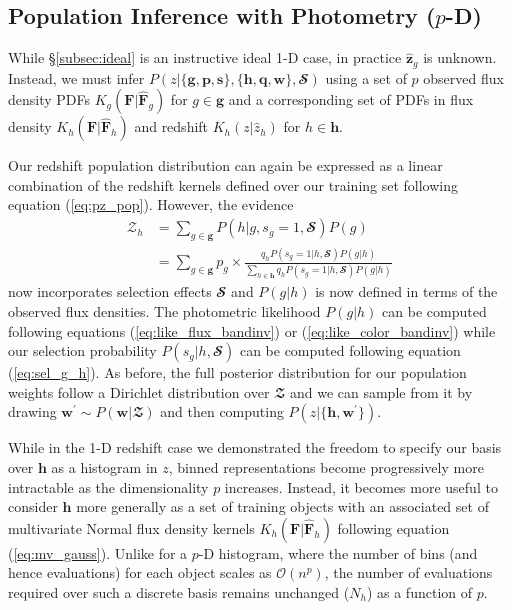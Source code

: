 \documentclass[a4paper,fleqn,usenatbib,english]{mnras}
\begin{document}
\subsection{Population Inference with Photometry ($p$-D)}
\label{subsec:obs}

While \S\ref{subsec:ideal} is an instructive ideal 1-D case, in practice $\mathbf{\hat{z}}_g$ is unknown. Instead, we must infer $P(z| \lbrace \mathbf{g},\mathbf{p},\mathbf{s} \rbrace, \lbrace \mathbf{h},\mathbf{q},\mathbf{w} \rbrace, \mathbfcal{S})$ using a set of $p$ observed flux density PDFs $K_g(\mathbf{F}|\mathbf{\hat{F}}_g)$ for $g \in \mathbf{g}$ and a corresponding set of PDFs in flux density $K_h(\mathbf{F}|\mathbf{\hat{F}}_h)$ and redshift $K_h(z|\hat{z}_h)$ for $h \in \mathbf{h}$.

Our redshift population distribution can again be expressed as a linear combination of the redshift kernels defined over our training set following equation (\ref{eq:pz_pop}). However, the evidence 
\begin{align}
\mathcal{Z}_{h} &= \sum_{g \in \mathbf{g}} P(h|g,s_g=1,\mathbfcal{S}) P(g) \nonumber \\ 
&= \sum_{g \in \mathbf{g}} p_g \times \frac{q_h P(s_g=1|h,\mathbfcal{S}) P(g|h)}{\sum_{h \in \mathbf{h}} q_h P(s_g=1|h,\mathbfcal{S}) P(g|h)} \label{eq:evidence2}
\end{align}
now incorporates selection effects $\mathbfcal{S}$ and $P(g|h)$ is now defined in terms of the observed flux densities. The photometric likelihood $P(g|h)$ can be computed following equations (\ref{eq:like_flux_bandinv}) or (\ref{eq:like_color_bandinv}) while our selection probability $P(s_g|h,\mathbfcal{S})$ can be computed following equation (\ref{eq:sel_g_h}). As before, the full posterior distribution for our population weights follow a Dirichlet distribution over $\mathbfcal{Z}$ and we can sample from it by drawing $\mathbf{w}^\prime \sim P(\mathbf{w}|\mathbfcal{Z})$ and then computing $P(z|\lbrace \mathbf{h},\mathbf{w}^\prime \rbrace)$.

While in the 1-D redshift case we demonstrated the freedom to specify our basis over $\mathbf{h}$ as a histogram in $z$, binned representations become progressively more intractable as the dimensionality $p$ increases. Instead, it becomes more useful to consider $\mathbf{h}$ more generally as a set of training objects with an associated set of multivariate Normal flux density kernels $K_h(\mathbf{F}|\mathbf{\hat{F}}_h)$ following equation (\ref{eq:mv_gauss}). Unlike for a $p$-D histogram, where the number of bins (and hence evaluations) for each object scales as $\mathcal{O}(n^p)$, the number of evaluations required over such a discrete basis remains unchanged ($N_h$) as a function of $p$.
\end{document}

